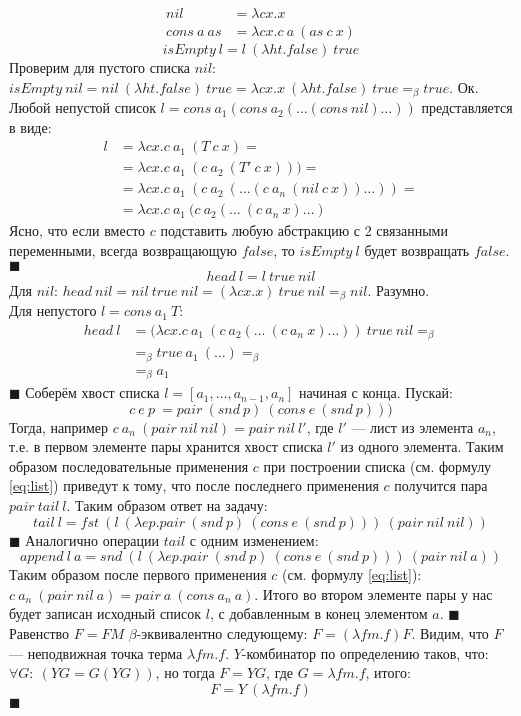 \begin{align*}
	nil &= \lambda cx.x \\
	cons\ a\ as &= \lambda cx.c\ a\ (as\ c\ x)
\end{align*}
\[isEmpty\ l = l\ (\lambda ht.false)\ true\]
Проверим для пустого списка $nil$: $isEmpty\ nil = nil\ (\lambda ht.false)\ true = \lambda cx.x\ (\lambda ht.false)\ 
true =_\beta true$. Ок. Любой непустой список $l = cons\ a_1 (cons\ a_2 (\ldots(cons\ nil)\ldots))$ представляется в виде:
\begin{align}
l &= \lambda cx.c\ a_1\ (T\ c\ x)=\\
  &= \lambda cx.c\ a_1\ (c\ a_2\ (T'\ c\ x)))=\\
  &= \lambda cx.c\ a_1\ (c\ a_2\ (\ldots (c\ a_n\ (nil\ c\ x))\ldots))=\\
  &= \lambda cx.c\ a_1\ (c\ a_2(\ldots\ (c\ a_n\ x)\ldots) \label{eq:list}
\end{align}
Ясно, что если вместо $c$ подставить любую абстракцию с 2 связанными переменными, всегда возвращающую $false$, то $isEmpty\ l$ будет возвращать $false$. \hfill $\blacksquare$
\task{$head$}
\[ head\ l =  l\ true\ nil\]
Для $nil$: $head\ nil = nil\ true\ nil = (\lambda cx.x)\ true\ nil =_\beta nil$. Разумно.\\
Для непустого $l = cons\ a_1\ T$: 
\begin{align*}
head\ l &= (\lambda cx.c\ a_1\ (c\ a_2(\ldots\ (c\ a_n\ x)\ldots))\ true\ nil =_\beta \\
	    &=_\beta true\ a_1\ (\ldots) =_\beta \\
	    &=_\beta a_1
\end{align*}
\hfill $\blacksquare$
Соберём хвост списка $l = [a_1,\ldots,a_{n-1},a_n]$ начиная с конца. Пускай:
\[c\ e\ p\ = pair\ (snd\ p)\ (cons\ e\ (snd\ p)))\]
Тогда, например $c\ a_n\ (pair\ nil\ nil) = pair\ nil\ l'$, где $l'$ --- лист из элемента $a_n$, т.е. в первом элементе пары хранится хвост списка $l'$ из одного элемента. Таким образом последовательные применения $c$ при построении списка (см. формулу \ref{eq:list}) приведут к тому, что после последнего применения $c$ получится пара $pair\ tail\ l$. Таким образом ответ на задачу:
\[tail\ l = fst\ (l\ (\lambda ep.pair\ (snd\ p)\ (cons\ e\ (snd\ p)))\ (pair\ nil\ nil))\]
\hfill $\blacksquare$
Аналогично операции $tail$ с одним изменением:
\[append\ l\ a = snd\ (l\ (\lambda ep.pair\ (snd\ p)\ (cons\ e\ (snd\ p)))\ (pair\ nil\ a))\]
Таким образом после первого применения $c$ (см. формулу \ref{eq:list}): $c\ a_n\ (pair\ nil\ a) = pair\ a\ (cons\ a_n\ a)$. Итого во втором элементе пары у нас будет записан исходный список $l$, с добавленным в конец элементом $a$. \hfill $\blacksquare$
\tasksection{$Y$-комбинатор}
Равенство $F=FM$ $\beta$-эквивалентно следующему: $F=(\lambda fm.f)F$. Видим, что $F$ --- неподвижная точка терма $\lambda fm.f$.
$Y$-комбинатор по определению таков, что: $\forall G:\ (YG=G(YG))$, но тогда $F=YG$, где $G=\lambda fm.f$, итого:
\[
	F = Y\ (\lambda fm.f)
\]
\hfill $\blacksquare$

